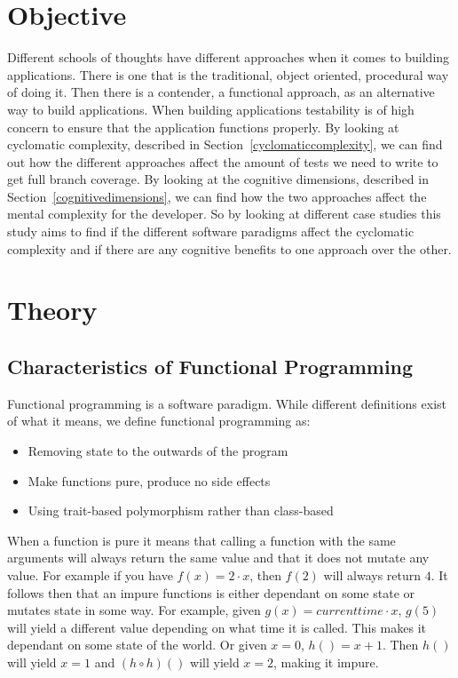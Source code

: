 \documentclass[12pt]{article}
\theoremstyle{definition}
\theoremstyle{theorem}
\begin{document}
\section{Objective}

Different schools of thoughts have different approaches when it comes to
building applications. There is one that is the traditional, object oriented,
procedural way of doing it. Then there is a contender, a functional approach, as
an alternative way to build applications. When building applications testability
is of high concern to ensure that the application functions properly. By looking
at cyclomatic complexity, described in Section~\ref{cyclomaticcomplexity}, we
can find out how the different approaches affect the amount of tests we need to
write to get full branch coverage. By looking at the cognitive dimensions,
described in Section~\ref{cognitivedimensions}, we can find how the two
approaches affect the mental complexity for the developer. So by looking at
different case studies this study aims to find if the different software
paradigms affect the cyclomatic complexity and if there are any cognitive
benefits to one approach over the other.

\section{Theory}\label{theory}

\subsection{Characteristics of Functional Programming}

Functional programming is a software paradigm. While different definitions exist
of what it means, we define functional programming as:

\begin{itemize}
    \item Removing state to the outwards of the program
    \item Make functions pure, produce no side effects
    \item Using trait-based polymorphism rather than class-based
\end{itemize}

When a function is pure it means that calling a function with the same arguments
will always return the same value and that it does not mutate any value. For
example if you have $f(x) = 2\cdot x$, then $f(2)$ will always return $4$. It
follows then that an impure functions is either dependant on some state or
mutates state in some way. For example, given $g(x) = currenttime \cdot x$,
$g(5)$ will yield a different value depending on what time it is called. This
makes it dependant on some state of the world. Or given $x=0$, $h()=x+1$. Then
$h()$ will yield $x=1$ and $(h \circ h)()$ will yield $x=2$, making it
impure.~\cite{wikipedia_pure}
\end{document}

